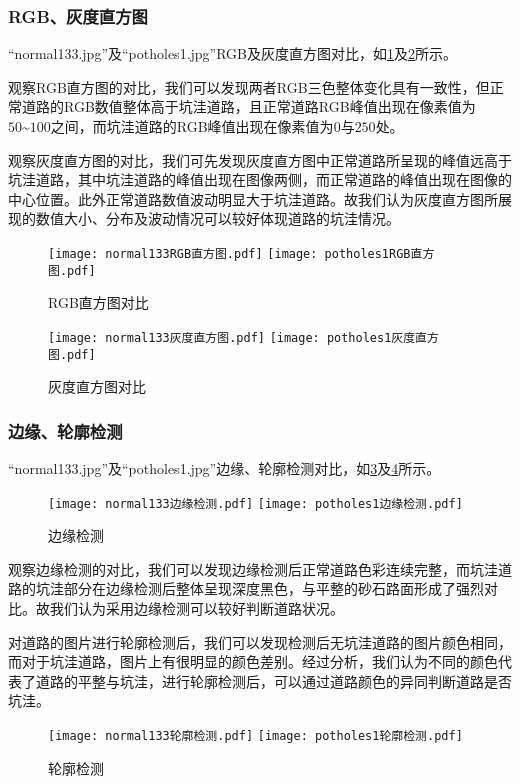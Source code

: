 \documentclass{MathorCupmodeling}
\begin{document}
	\subsubsection{RGB、灰度直方图}
	“normal133.jpg”及“potholes1.jpg”RGB及灰度直方图对比，如\textcolor{blue}{\cref{fig:RGB对比}}及\textcolor{blue}{\cref{fig:灰度对比}}所示。
	
	观察RGB直方图的对比，我们可以发现两者RGB三色整体变化具有一致性，但正常道路的RGB数值整体高于坑洼道路，且正常道路RGB峰值出现在像素值为$50\text{\textasciitilde}100$之间，而坑洼道路的RGB峰值出现在像素值为$0$与$250$处。

	观察灰度直方图的对比，我们可先发现灰度直方图中正常道路所呈现的峰值远高于坑洼道路，其中坑洼道路的峰值出现在图像两侧，而正常道路的峰值出现在图像的中心位置。此外正常道路数值波动明显大于坑洼道路。故我们认为灰度直方图所展现的数值大小、分布及波动情况可以较好体现道路的坑洼情况。
	\begin{figure}[H]
		\centering
		\texttt{[image: normal133RGB直方图.pdf]}
		\hspace{0.3in}
		\texttt{[image: potholes1RGB直方图.pdf]}
		\caption{RGB直方图对比}
		\label{fig:RGB对比}
	\end{figure}
	\begin{figure}[H]
		\centering
		\texttt{[image: normal133灰度直方图.pdf]}
		\hspace{0.3in}
		\texttt{[image: potholes1灰度直方图.pdf]}
		\caption{灰度直方图对比}
		\label{fig:灰度对比}
	\end{figure}
	
	\subsubsection{边缘、轮廓检测}
	“normal133.jpg”及“potholes1.jpg”边缘、轮廓检测对比，如\textcolor{blue}{\cref{fig:边缘检测}}及\textcolor{blue}{\cref{fig:轮廓检测}}所示。
	\begin{figure}[H]
		\centering
		\texttt{[image: normal133边缘检测.pdf]}
		\hspace{0.3in}
		\texttt{[image: potholes1边缘检测.pdf]}
		\caption{边缘检测}
		\label{fig:边缘检测}
	\end{figure}
	观察边缘检测的对比，我们可以发现边缘检测后正常道路色彩连续完整，而坑洼道路的坑洼部分在边缘检测后整体呈现深度黑色，与平整的砂石路面形成了强烈对比。故我们认为采用边缘检测可以较好判断道路状况。

	对道路的图片进行轮廓检测后，我们可以发现检测后无坑洼道路的图片颜色相同，而对于坑洼道路，图片上有很明显的颜色差别。经过分析，我们认为不同的颜色代表了道路的平整与坑洼，进行轮廓检测后，可以通过道路颜色的异同判断道路是否坑洼。
	\begin{figure}[H]
		\centering
		\texttt{[image: normal133轮廓检测.pdf]}
		\hspace{0.3in}
		\texttt{[image: potholes1轮廓检测.pdf]}
		\caption{轮廓检测}
		\label{fig:轮廓检测}
	\end{figure}
\end{document}
